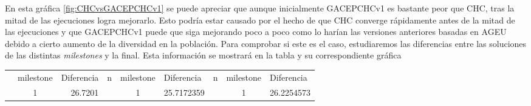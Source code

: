 En esta gráfica \ref{fig:CHCvsGACEPCHCv1} se puede apreciar que aunque inicialmente GACEPCHCv1 es bastante peor que CHC, tras la mitad de las ejecuciones logra mejorarlo. 
Esto podría estar causado por el hecho de que CHC converge rápidamente antes de la mitad de las ejecuciones y que GACEPCHCv1 puede que siga mejorando poco a poco como lo harían las versiones anteriores basadas en AGEU debido a cierto aumento de la diversidad en la población. 
Para comprobar si este es el caso, estudiaremos las diferencias entre las soluciones de las distintas \textit{milestones} y la final. 
Esta información se mostrará en la tabla y su correspondiente gráfica

\begin{table}[h]
\begin{tabular}{|ccrccrccr|}
\hline
\rowcolor[HTML]{FFFFC7} 
\multicolumn{9}{|c|}{\cellcolor[HTML]{FFFFC7}GACEPCHCv1}                                                                                                                                                                                                                                                                                                                                                                                                                                                                                                                                             \\ \hline
\rowcolor[HTML]{F7EAC7} 
\multicolumn{1}{|c|}{\cellcolor[HTML]{F7EAC7}n}                               & \multicolumn{1}{c|}{\cellcolor[HTML]{F7EAC7}milestone} & \multicolumn{1}{l|}{\cellcolor[HTML]{F7EAC7}Diferencia} & \multicolumn{1}{c|}{\cellcolor[HTML]{F7EAC7}n}                               & \multicolumn{1}{c|}{\cellcolor[HTML]{F7EAC7}milestone} & \multicolumn{1}{l|}{\cellcolor[HTML]{F7EAC7}Diferencia} & \multicolumn{1}{c|}{\cellcolor[HTML]{F7EAC7}n}                               & \multicolumn{1}{c|}{\cellcolor[HTML]{F7EAC7}milestone} & \multicolumn{1}{l|}{\cellcolor[HTML]{F7EAC7}Diferencia} \\ \hline
\rowcolor[HTML]{DAE8FC} 
\multicolumn{1}{|c|}{\cellcolor[HTML]{FFFFC7}}                                & \multicolumn{1}{c|}{\cellcolor[HTML]{DAE8FC}1}         & \multicolumn{1}{r|}{\cellcolor[HTML]{DAE8FC}26.7201}    & \multicolumn{1}{c|}{\cellcolor[HTML]{FFFFC7}}                                & \multicolumn{1}{c|}{\cellcolor[HTML]{DAE8FC}1}         & \multicolumn{1}{r|}{\cellcolor[HTML]{DAE8FC}25.7172359} & \multicolumn{1}{c|}{\cellcolor[HTML]{FFFFC7}}                                & \multicolumn{1}{c|}{\cellcolor[HTML]{DAE8FC}1}         & 26.2254573                                              \\ \cline{2-3} \cline{5-6} \cline{8-9} 

\end{tabular}
\end{table}
